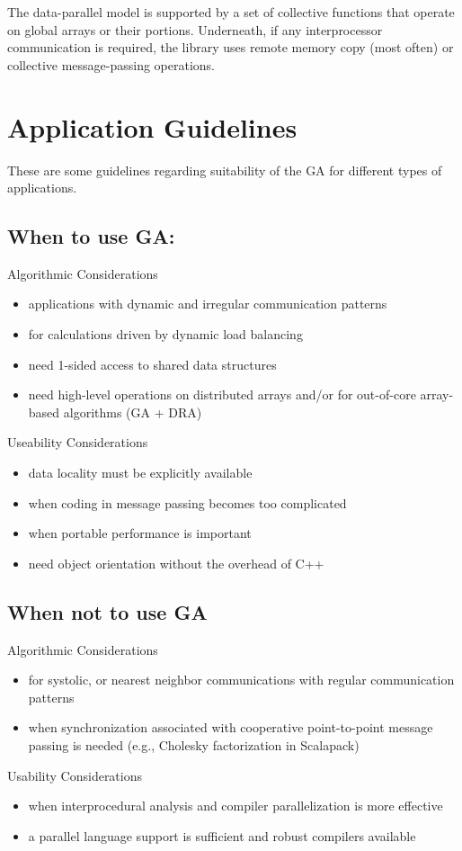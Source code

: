 The data-parallel model is supported by a set of collective functions
that operate on global arrays or their portions. Underneath, if any
interprocessor communication is required, the library uses remote
memory copy (most often) or collective message-passing operations. 


\section{Application Guidelines}

These are some guidelines regarding suitability of the GA for different
types of applications. 


\subsection{When to use GA: }

Algorithmic Considerations 
\begin{itemize}
\item applications with dynamic and irregular communication patterns 
\item for calculations driven by dynamic load balancing 
\item need 1-sided access to shared data structures 
\item need high-level operations on distributed arrays and/or for out-of-core
array-based algorithms (GA + DRA) 
\end{itemize}
Useability Considerations
\begin{itemize}
\item data locality must be explicitly available 
\item when coding in message passing becomes too complicated 
\item when portable performance is important 
\item need object orientation without the overhead of C++ 
\end{itemize}

\subsection{When not to use GA}

Algorithmic Considerations 
\begin{itemize}
\item for systolic, or nearest neighbor communications with regular communication
patterns 
\item when synchronization associated with cooperative point-to-point message
passing is needed (e.g., Cholesky factorization in Scalapack) 
\end{itemize}
Usability Considerations 
\begin{itemize}
\item when interprocedural analysis and compiler parallelization is more
effective 
\item a parallel language support is sufficient and robust compilers available 
\end{itemize}

